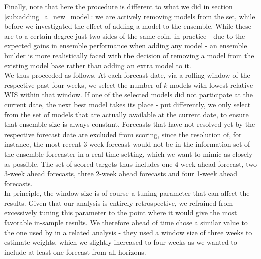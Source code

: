 Finally, note that here the procedure is different to what we did in section \ref{sub:adding_a_new_model}: we are actively removing models from the set, while before we investigated the effect of adding a model to the ensemble. While these are to a certain degree just two sides of the same coin, in practice - due to the expected gains in ensemble performance when adding any model - an ensemble builder is more realistically faced with the decision of removing a model from the existing model base rather than adding an extra model to it. \medskip \\
We thus proceeded as follows. At each forecast date, via a rolling window of the respective past four weeks, we select the number of $k$ models with lowest relative WIS within that window. If one of the selected models did not participate at the current date, the next best model takes its place - put differently, we only select from the set of models that are actually available at the current date, to ensure that ensemble size is always constant. Forecasts that have not resolved yet by the respective forecast date are excluded from scoring, since the resolution of, for instance, the most recent 3-week forecast would not be in the information set of the ensemble forecaster in a real-time setting, which we want to mimic as closely as possible. The set of scored targets thus includes one 4-week ahead forecast, two 3-week ahead forecasts, three 2-week ahead forecasts and four 1-week ahead forecasts.\\
In principle, the window size is of course a tuning parameter that can affect the results. Given that our analysis is entirely retrospective, we refrained from excessively tuning this parameter to the point where it would give the most favorable in-sample results. We therefore ahead of time chose a similar value to the one used by \cite{bracher_evaluating_2021} in a related analysis - they used a window size of three weeks to estimate weights, which we slightly increased to four weeks as we wanted to include at least one forecast from all horizons.\\
